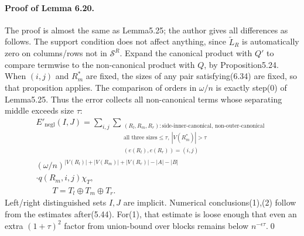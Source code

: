 \documentclass[10pt,a4paper]{article}
\begin{document}
\paragraph{Proof of Lemma 6.20.} The proof is almost the same as Lemma5.25; the author gives all differences as follows. The support condition does not affect anything, since $\widetilde L_R$ is automatically zero on columns/rows not in $\mathcal S^R$. Expand the canonical product with $Q'$ to compare termwise to the non-canonical product with $Q$, by Proposition5.24. When $(i,j)$ and $R^*_m$ are fixed, the sizes of any pair satisfying(6.34) are fixed, so that proposition applies. The comparison of orders in $\omega/n$ is exactly step(0) of Lemma5.25. Thus the error collects all non-canonical terms whose separating middle exceeds size $\tau$:
\begin{multline*}E'_{\mathrm{negl}}(I,J)=\sum_{i,j}\sum_{\substack{(R_l,R_m,R_r):\text{side-inner-canonical, non-outer-canonical}\\\text{all three sizes}\le\tau,\ |V(R^*_m)|>\tau\\(e(R_l),e(R_r))=(i,j)}}\\
(\omega/n)^{|V(R_l)|+|V(R_m)|+|V(R_r)|-|A|-|B|}\\\cdot q(R_m,i,j)\chi_T,\\
\qquad T=T_l\oplus T_m\oplus T_r.\tag{6.37}\end{multline*}
Left/right distinguished sets $I,J$ are implicit. Numerical conclusions(1),(2) follow from the estimates after(5.44). For(1), that estimate is loose enough that even an extra $(1+\tau)^2$ factor from union-bound over blocks remains below $n^{-\epsilon\tau}$.\qed
\end{document}
